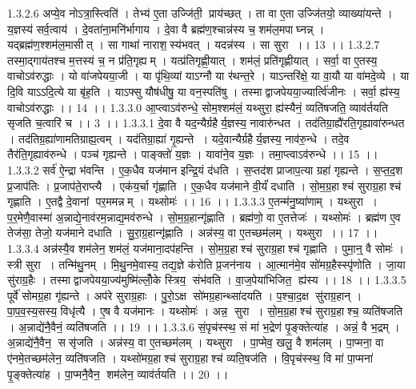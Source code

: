 1.3.2.6
अप्ये॒व नोऽत्रा॒स्त्विति॑ । तेभ्य॑ ए॒ता उज्जि॑ती॒ प्राय॑च्छत् । ता वा ए॒ता उज्जि॑तयो॒ व्याख्या॑यन्ते । य॒ज्ञस्य॑ सर्व॒त्वाय॑ । दे॒वता॑ना॒मनि॑र्भागाय । दे॒वा वै ब्रह्म॑ण॒श्चान्न॑स्य च॒ शम॑ल॒मपाघ्नन्न् । यद्ब्रह्म॑ण॒श्शम॑ल॒मासीत् । सा गाथा॑ नाराश॒॒स्य॑भवत् । यदन्न॑स्य । सा सुरा ।। 13 ।।
1.3.2.7
तस्मा॒द्गाय॑तश्च म॒त्तस्य॑ च॒ न प्र॑ति॒गृह्यम् । यत्प्र॑तिगृह्णी॒यात् । शम॑लं॒ प्रति॑गृह्णीयात् । सर्वा॒ वा ए॒तस्य॒ वाचोऽव॑रुद्धाः । यो वा॑जपेयया॒जी । या पृ॑थि॒व्यां याऽग्नौ या र॑थन्त॒रे । याऽन्तरि॑क्षे॒ या वा॒यौ या वा॑मदे॒व्ये । या दि॒वि याऽऽदि॒त्ये या बृ॑ह॒ति । याऽफ्सु यौष॑धीषु॒ या वन॒स्पति॑षु । तस्माद्वाजपेयया॒ज्यार्त्वि॑जीनः । सर्वा॒ ह्य॑स्य॒ वाचोऽव॑रुद्धाः ।। 14 ।।
1.3.3.0
आ॒प्त्वाऽव॑रुन्धे॒ सोम॒श्शम॑लं॒ यथ्सुरा॒ ह्य॑स्यैनं॒ व्यति॑षजति॒ व्याव॑र्तयति सृजति च॒त्वारि॑ च ।। 3 ।।
1.3.3.1
दे॒वा वै यद॒न्यैर्ग्रहैर्य॒ज्ञस्य॒ नावारु॑न्धत । तद॑तिग्रा॒ह्यै॑रति॒गृह्यावा॑रुन्धत । तद॑तिग्र॒ह्या॑णामतिग्राह्य॒त्वम् । यद॑तिग्रा॒ह्या॑ गृ॒ह्यन्ते । यदे॒वान्यैर्ग्रहैर्य॒ज्ञस्य॒ नाव॑रु॒न्धे । तदे॒व तैर॑ति॒गृह्याव॑रुन्धे । पञ्च॑ गृह्यन्ते । पाङ्क्तो॑ य॒ज्ञः । यावा॑ने॒व य॒ज्ञः । तमा॒प्त्वाऽव॑रुन्धे ।। 15 ।।
1.3.3.2
सर्व॑ ऐ॒न्द्रा भ॑वन्ति । ए॒क॒धैव यज॑मान इन्द्रि॒यं द॑धति । स॒प्तद॑श प्राजाप॒त्या ग्रहा॑ गृह्यन्ते । स॒प्त॒द॒श प्र॒जाप॑तिः । प्र॒जाप॑ते॒राप्त्यै । एक॑य॒र्चा गृ॑ह्णाति । ए॒क॒धैव यज॑माने वी॒र्यं॑ दधाति । सो॒म॒ग्र॒हाश्च॑ सुराग्र॒हाश्च॑ गृह्णाति । ए॒तद्वै दे॒वानां पर॒ममन्नम् । यथ्सोमः॑ ।। 16 ।।
1.3.3.3
ए॒तन्म॑नु॒ष्या॑णाम् । यथ्सुरा । प॒र॒मेणै॒वास्मा॑ अ॒न्नाद्ये॒नाव॑रम॒न्नाद्य॒मव॑रुन्धे । सो॒म॒ग्र॒हान्गृ॑ह्णाति । ब्रह्म॑णो॒ वा ए॒तत्तेजः॑ । यथ्सोमः॑ । ब्रह्म॑ण ए॒व तेज॑सा॒ तेजो॒ यज॑माने दधाति । सु॒रा॒ग्र॒हान्गृ॑ह्णाति । अन्न॑स्य॒ वा ए॒तच्छम॑लम् । यथ्सुरा ।। 17 ।।
1.3.3.4
अन्न॑स्यै॒व शम॑लेन॒ शम॑लं॒ यज॑माना॒दप॑हन्ति । सो॒म॒ग्र॒हाश्च॑ सुराग्र॒हाश्च॑ गृह्णाति । पुमा॒न्॒ वै सोमः॑ । स्त्री सुरा । तन्मि॑थु॒नम् । मि॒थु॒नमे॒वास्य॒ तद्य॒ज्ञे क॑रोति प्र॒जन॑नाय । आ॒त्मान॑मे॒व सो॑मग्र॒हैस्स्पृ॑णोति । जा॒या सु॑राग्र॒हैः । तस्माद्वाजपेयया॒ज्य॑मुष्मि॑ल्लोँ॒के स्त्रिय॒॒ संभ॑वति । वा॒ज॒पेया॑भिजित॒॒ ह्य॑स्य ।। 18 ।।
1.3.3.5
पूर्वे॑ सोमग्र॒हा गृ॑ह्यन्ते । अप॑रे सुराग्र॒हाः । पु॒रो॒ऽक्ष सो॑मग्र॒हान्थ्सा॑दयति । प॒श्चा॒द॒क्ष सु॑राग्र॒हान् । पा॒प॒व॒स्य॒सस्य॒ विधृ॑त्यै । ए॒ष वै यज॑मानः । यथ्सोमः॑ । अन्न॒॒ सुरा । सो॒म॒ग्र॒हाश्च॑ सुराग्र॒हाश्च॒ व्यति॑षजति । अ॒न्नाद्ये॑नै॒वैनं॒ व्यति॑षजति ।। 19 ।।
1.3.3.6
सं॒पृच॑स्स्थ॒ सं मा॑ भ॒द्रेण॑ पृ॒ङ्क्तेत्या॑ह । अन्नं॒ वै भ॒द्रम् । अ॒न्नाद्ये॑नै॒वैन॒॒ ससृ॑जति । अन्न॑स्य॒ वा ए॒तच्छम॑लम् । यथ्सुरा । पा॒प्मेव॒ खलु॒ वै शम॑लम् । पा॒प्मना॒ वा ए॑नमे॒तच्छम॑लेन॒ व्यति॑षजति । यथ्सो॑मग्र॒हाश्च॑ सुराग्र॒हाश्च॑ व्यति॒षज॑ति । वि॒पृच॑स्स्थ॒ वि मा॑ पा॒प्मना॑ पृ॒ङ्क्तेत्या॑ह । पा॒प्मनै॒वैन॒॒ शम॑लेन॒ व्याव॑र्तयति ।। 20 ।।
